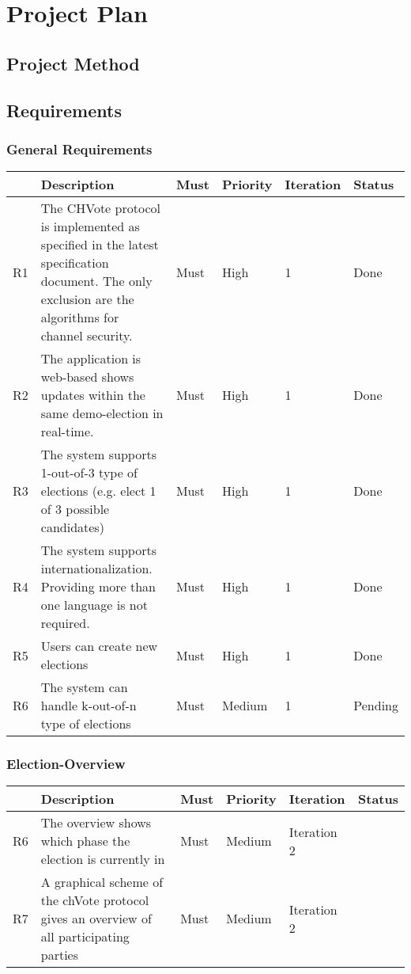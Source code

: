 \chapter{Project Plan}
\section{Project Method}
\section{Requirements}
\subsection{General Requirements}
\begin{longtable}{p{0.4cm}p{9cm}p{1cm}p{1cm}p{1cm}p{1cm}}
\hline
 & Description & Must & Priority & Iteration & Status\\
\hline
R1 & The CHVote protocol is implemented as specified in the latest specification document. The only exclusion are the algorithms for channel security. & Must & High & 1 & Done\\
R2 & The application is web-based shows updates within the same demo-election in real-time. & Must & High & 1 & Done\\
R3 & The system supports 1-out-of-3 type of elections (e.g. elect 1 of 3 possible candidates) & Must & High & 1 & Done\\
R4 & The system supports internationalization. Providing more than one language is not required. & Must & High & 1 & Done\\
R5 & Users can create new elections & Must & High & 1 & Done \\
R6 & The system can handle k-out-of-n type of elections & Must & Medium & 1 & Pending\\
\end{longtable}


\subsection{Election-Overview}
\begin{longtable}{p{0.4cm}p{9cm}p{1cm}p{1cm}p{1cm}p{1cm}}
\hline
 & Description & Must & Priority & Iteration & Status\\
\hline
R6 & The overview shows which phase the election is currently in & Must & Medium & Iteration 2 & \\
R7 & A graphical scheme of the chVote protocol gives an overview of all participating parties & Must & Medium & Iteration 2 & \\
\end{longtable}

